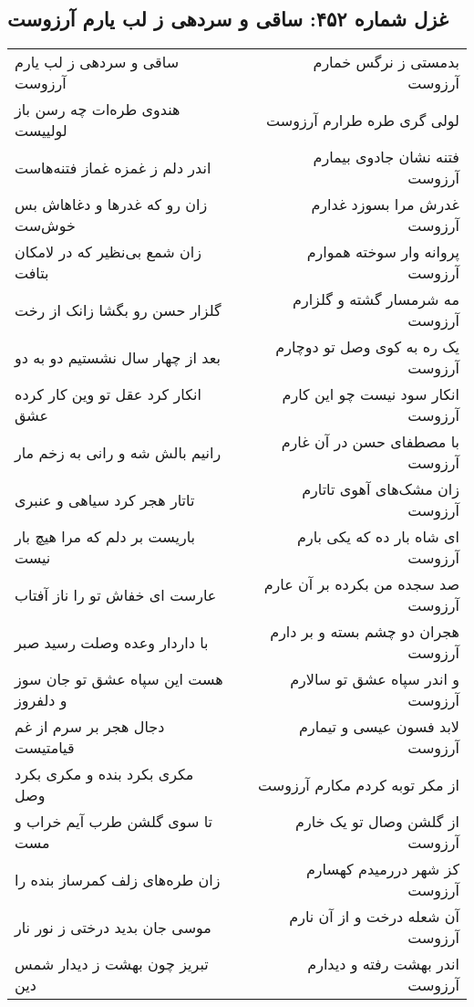 \begin{center}
\section*{غزل شماره ۴۵۲: ساقی و سردهی ز لب یارم آرزوست}
\label{sec:0452}
\begin{longtable}{l p{0.5cm} r}
ساقی و سردهی ز لب یارم آرزوست
&&
بدمستی ز نرگس خمارم آرزوست
\\
هندوی طره‌ات چه رسن باز لولییست
&&
لولی گری طره طرارم آرزوست
\\
اندر دلم ز غمزه غماز فتنه‌هاست
&&
فتنه نشان جادوی بیمارم آرزوست
\\
زان رو که غدرها و دغاهاش بس خوش‌ست
&&
غدرش مرا بسوزد غدارم آرزوست
\\
زان شمع بی‌نظیر که در لامکان بتافت
&&
پروانه وار سوخته هموارم آرزوست
\\
گلزار حسن رو بگشا زانک از رخت
&&
مه شرمسار گشته و گلزارم آرزوست
\\
بعد از چهار سال نشستیم دو به دو
&&
یک ره به کوی وصل تو دوچارم آرزوست
\\
انکار کرد عقل تو وین کار کرده عشق
&&
انکار سود نیست چو این کارم آرزوست
\\
رانیم بالش شه و رانی به زخم مار
&&
با مصطفای حسن در آن غارم آرزوست
\\
تاتار هجر کرد سیاهی و عنبری
&&
زان مشک‌های آهوی تاتارم آرزوست
\\
باریست بر دلم که مرا هیچ بار نیست
&&
ای شاه بار ده که یکی بارم آرزوست
\\
عارست ای خفاش تو را ناز آفتاب
&&
صد سجده من بکرده بر آن عارم آرزوست
\\
با داردار وعده وصلت رسید صبر
&&
هجران دو چشم بسته و بر دارم آرزوست
\\
هست این سپاه عشق تو جان سوز و دلفروز
&&
و اندر سپاه عشق تو سالارم آرزوست
\\
دجال هجر بر سرم از غم قیامتیست
&&
لابد فسون عیسی و تیمارم آرزوست
\\
مکری بکرد بنده و مکری بکرد وصل
&&
از مکر توبه کردم مکارم آرزوست
\\
تا سوی گلشن طرب آیم خراب و مست
&&
از گلشن وصال تو یک خارم آرزوست
\\
زان طره‌های زلف کمرساز بنده را
&&
کز شهر دررمیدم کهسارم آرزوست
\\
موسی جان بدید درختی ز نور نار
&&
آن شعله درخت و از آن نارم آرزوست
\\
تبریز چون بهشت ز دیدار شمس دین
&&
اندر بهشت رفته و دیدارم آرزوست
\\
\end{longtable}
\end{center}
